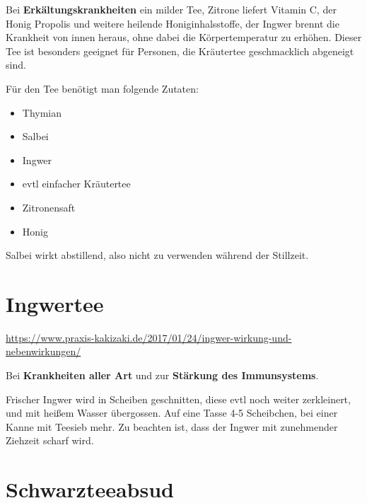 

Bei \textbf{Erkältungskrankheiten} ein milder Tee, Zitrone liefert Vitamin C, der Honig Propolis und weitere heilende Honiginhalsstoffe, der Ingwer brennt die Krankheit von innen heraus, ohne dabei die Körpertemperatur zu erhöhen. Dieser Tee ist besonders geeignet für Personen, die Kräutertee geschmacklich abgeneigt sind.

Für den Tee benötigt man folgende Zutaten:

\begin{itemize}
	\item Thymian
	\item Salbei
	\item Ingwer
	\item evtl einfacher Kräutertee
	\item Zitronensaft
	\item Honig
\end{itemize}



Salbei wirkt abstillend, also nicht zu verwenden während der Stillzeit.


\newpage


\section{Ingwertee}
\label{   }



\url{https://www.praxis-kakizaki.de/2017/01/24/ingwer-wirkung-und-nebenwirkungen/}

  



Bei \textbf{Krankheiten aller Art} und zur \textbf{Stärkung des Immunsystems}.


Frischer Ingwer wird in Scheiben geschnitten, diese evtl noch weiter zerkleinert, und mit heißem Wasser übergossen. Auf eine Tasse 4-5 Scheibchen, bei einer Kanne mit Teesieb mehr. Zu beachten ist, dass der Ingwer mit zunehmender Ziehzeit scharf wird.




\newpage


\section{Schwarzteeabsud}
\label{   }

